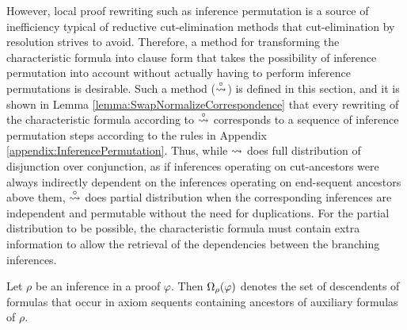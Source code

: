 \noindent
However, local proof rewriting such as inference permutation is a source of inefficiency typical of reductive cut-elimination methods that cut-elimination by resolution strives to avoid. Therefore, a method for transforming the characteristic formula into clause form that takes the possibility of inference permutation into account without actually having to perform inference permutations is desirable. Such a method ($\stackrel{\circ}{\leadsto}$) is defined in this section, and it is shown in Lemma \ref{lemma:SwapNormalizeCorrespondence} that every rewriting of the characteristic formula according to $\stackrel{\circ}{\leadsto}$ corresponds to a sequence of inference permutation steps according to the rules in Appendix \ref{appendix:InferencePermutation}. Thus, while $\leadsto$ does full distribution of disjunction over conjunction, as if inferences operating on cut-ancestors were always indirectly dependent on the inferences operating on end-sequent ancestors above them, $\stackrel{\circ}{\leadsto}$ does partial distribution when the corresponding inferences are independent and permutable without the need for duplications. For the partial distribution to be possible, the characteristic formula must contain extra information to allow the retrieval of the dependencies between the branching inferences.



\begin{definition}
\label{definition:InferenceOccurrences}
Let $\rho$ be an inference in a proof $\varphi$. Then
$
\Omega_{\rho}(\varphi)
$
denotes the set of descendents of formulas that occur in axiom sequents containing ancestors of auxiliary formulas of $\rho$.
\end{definition}


\newcommand{\marked}[1]{#1^*}

